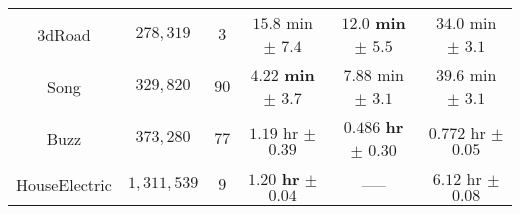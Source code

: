 \begin{tabular}{ cccccc }
  3dRoad               & $278,\!319$        & $3$   &               $15.8$ min       $\pm$ $7.4$                    &      $\mathbf{12.0}$ {\bf min} $\mathbf{\pm}$ $\mathbf{5.5}$    &       $34.0$ min $\pm$ $3.1$    \\
  Song                 & $329,\!820$        & $90$  &      $\mathbf{4.22}$ {\bf min} $\mathbf{\pm}$ $\mathbf{3.7}$  &               $7.88$ min       $\pm$ $3.1$                      &       $39.6$ min $\pm$ $3.1$    \\
  Buzz                 & $373,\!280$        & $77$  &               $1.19$ hr        $\pm$ $0.39$                   &      $\mathbf{0.486}$ {\bf hr} $\mathbf{\pm}$ $\mathbf{0.30}$   &      $0.772$ hr  $\pm$ $0.05$   \\
  HouseElectric        & $1,\!311,\!539$    & $9$   &      $\mathbf{1.20}$ {\bf hr}  $\mathbf{\pm}$ $\mathbf{0.04}$ &                -----                                            &      $6.12$  hr  $\pm$ $0.08$   \\
  \bottomrule
\end{tabular}
